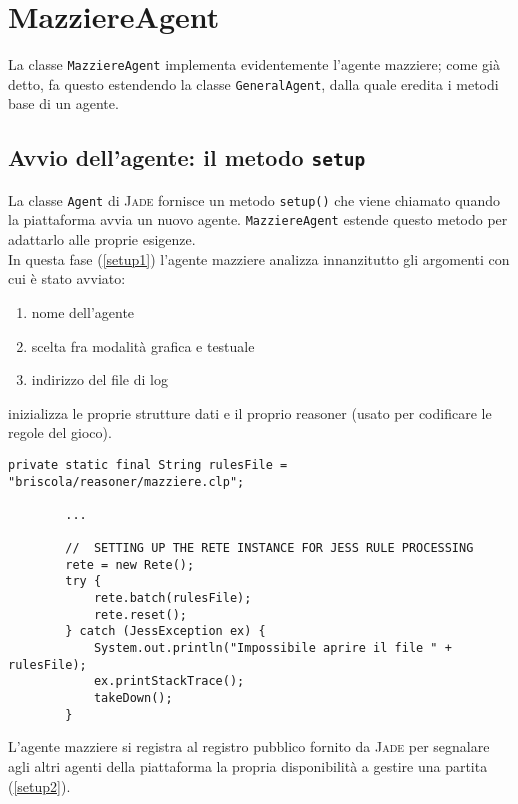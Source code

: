 \section{MazziereAgent}

La classe \texttt{MazziereAgent} implementa evidentemente l'agente mazziere; come già detto, fa questo estendendo la classe \texttt{GeneralAgent}, dalla quale eredita i metodi base di un agente.\\

\subsection{Avvio dell'agente: il metodo \texttt{setup}}
La classe \texttt{Agent} di \textsc{Jade} fornisce un metodo \texttt{setup()} che viene chiamato quando la piattaforma avvia un nuovo agente.
\texttt{MazziereAgent} estende questo metodo per adattarlo alle proprie esigenze.\\
In questa fase (\ref{setup1}) l'agente mazziere analizza innanzitutto gli argomenti con cui è stato avviato:
\begin{enumerate}
   \item nome dell'agente
   \item scelta fra modalità grafica e testuale
   \item indirizzo del file di log
\end{enumerate}
inizializza le proprie strutture dati e il proprio reasoner (usato per codificare le regole del gioco).
\begin{lstlisting}[caption={stralcio del metodo setup() di MazziereAgent: inizializzazione strutture e reasoner},label=setup1]
        private static final String rulesFile = "briscola/reasoner/mazziere.clp";
        
        ...
        
        //  SETTING UP THE RETE INSTANCE FOR JESS RULE PROCESSING
        rete = new Rete();
        try {
            rete.batch(rulesFile);
            rete.reset();
        } catch (JessException ex) {
            System.out.println("Impossibile aprire il file " + rulesFile);
            ex.printStackTrace();
            takeDown();
        }
\end{lstlisting}


L'agente mazziere si registra al registro pubblico fornito da \textsc{Jade} per segnalare agli altri agenti della piattaforma la propria disponibilità a gestire una partita (\ref{setup2}). 

